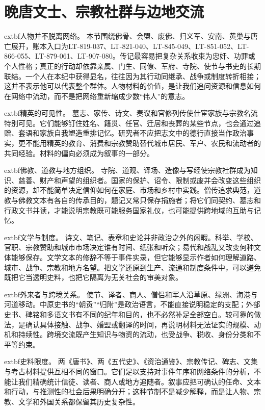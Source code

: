 \section{晚唐文士、宗教社群与边地交流}
\label{sec:late-tang-literati-religion-exchange}

\noindent	extbf{人物并不脱离网络。} 本节围绕佛骨、会盟、废佛、归义军、安南、黄巢与唐亡展开，账本入口为LT-819-037、LT-821-040、LT-845-049、LT-851-052、LT-866-055、LT-879-061、LT-907-080。传记最容易把复杂关系收束为忠奸、功罪或个人性格；真正的行动却依靠亲属、门生、同僚、军府、寺院、使节与书吏的长期联结。一个人在本纪中获得显名，往往因为其行动同继承、战争或制度转折相接；这并不表示他可以代表整个群体。人物材料的价值，是让我们追问资源和信息如何在网络中流动，而不是把网络重新缩成少数“伟人”的意志。

\noindent	extbf{精英的可见性。} 墓志、家传、诗文、奏议和官修列传使仕宦家族与宗教名流特别可见。它们能够钉住姓名、籍贯、任官、迁居和丧葬的某些节点，也会通过追赠、套语和家族自我塑造重排记忆。研究者不应把志文中的德行直接当作政治事实，更不能用精英的教育、消费和宗教赞助替代城市居民、军户、农民和流动者的共同经验。材料的偏向必须成为叙事的一部分。

\noindent	extbf{佛教、道教与地方组织。} 寺院、道观、译场、造像与写经使宗教社群成为知识、慈善、财产和声望的组织者。国家的保护、诏令、限制或废并会改变这些组织的资源，却不能简单决定信仰如何在家庭、市场和乡村中实践。僧传追求典范，道教与佛教文本有各自的传承目的，题记又常只保存捐施者；将它们同契约、墓志和行政文书并读，才能说明宗教既可能服务国家礼仪，也可能提供跨地域的互助与记忆。

\noindent	extbf{文学与制度。} 诗文、笔记、表章和史论并非政治之外的闲暇。科举、学校、官职、宗教赞助和城市市场决定谁有时间、纸张和听众；易代和战乱又改变何种文体能够保存。文学文本的修辞不等于事件实录，但它能够显示作者如何理解道路、城市、战争、宗教和地方名望。把文学还原到生产、流通和制度条件中，可以避免既把它当透明史料，也把它隔离为无关社会的审美对象。

\noindent	extbf{外来者与跨境关系。} 使节、译者、商人、僧侣和军人沿草原、绿洲、海港与河道移动。中原史书的“朝贡”“归附”是政治语言，不能直接说明稳定的支配；外部史书、碑铭和多语文书有不同的纪年和目的，也不必然补足全部空白。较可靠的做法，是确认具体接触、战争、婚盟或翻译的时间，再说明材料无法证实的规模、动机和持续性。跨境交流既产生知识与物资的流动，也受战争、税收、身份分类和不平等约束。

\noindent	extbf{史料限度。} 两《唐书》、两《五代史》、《资治通鉴》、宗教传记、碑志、文集与考古材料提供互相不同的窗口。它们足以支持对事件年序和网络条件的分析，不能让我们精确统计信徒、读者、商人或地方追随者。叙事应把可确认的任命、文本和行动，与推测性的社会后果明确分开；这种节制不是减少解释，而是让人物、宗教、文学和外国关系都保留其历史复杂性。

